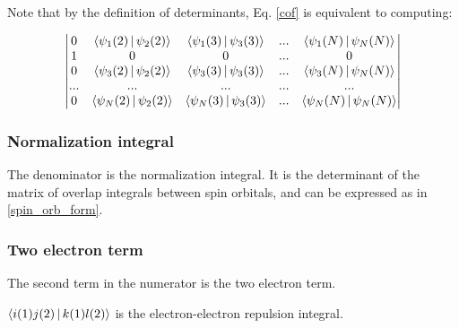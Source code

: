 \documentclass[a4paper]{article}
\begin{document}
Note that by the definition of determinants, Eq. \ref{cof} is equivalent to computing:


\begin{equation}
 \begin{aligned}
    \begin{vmatrix} 
   0  &  \Braket{ \psi_1(2) | \psi_2(2) } & \Braket{ \psi_1(3) | \psi_3(3) } & ... &  \Braket{ \psi_1(N) | \psi_N(N) } \\
   1 & 0& 0 & ... & 0 \\
   0  &  \Braket{ \psi_3(2) | \psi_2(2) } & \Braket{ \psi_3(3) | \psi_3(3) } &... &  \Braket{ \psi_3(N) | \psi_N(N) } \\
    ... & ... & ... & ...& ...\\
    0&  \Braket{ \psi_N(2)|  \psi_2(2) }& \Braket{ \psi_N(3) | \psi_3(3) } & ...&  \Braket{ \psi_N(N) | \psi_N(N) }\\
    \end{vmatrix}
         \end{aligned}
     \end{equation}

\subsubsection{Normalization integral}

    The denominator is the normalization integral. It is the determinant of the matrix of overlap integrals between spin orbitals, and can be expressed as in \ref{spin_orb_form}. 


\subsubsection{Two electron term}
    The second term in the numerator is the two electron term.                                                                                                                                                                
                                                                                                                                                                                                             
    $\Braket{ i(1) j(2) | k(1) l(2) }$ is the electron-electron repulsion integral.                                                                                                                                                                                                                                                                               
                                                                                                                                                                                                             
\end{document}
